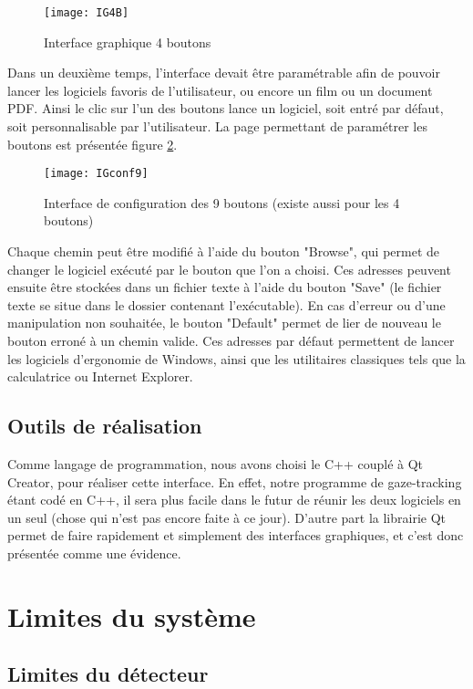 \begin{figure}[H]
  \centering
  \texttt{[image: IG4B]}
  \caption{Interface graphique 4 boutons}
  \label{fig:IG4B}
\end{figure}

Dans un deuxième temps, l’interface devait être paramétrable afin de pouvoir lancer les logiciels favoris de l’utilisateur, ou encore un film ou un document PDF. Ainsi le clic sur l’un des boutons lance un logiciel, soit entré par défaut, soit personnalisable par l’utilisateur. La page permettant de paramétrer les boutons est présentée figure \ref{fig:IGconf9}.

\begin{figure}[H]
  \centering
  \texttt{[image: IGconf9]}
  \caption{Interface de configuration des 9 boutons (existe aussi pour les 4 boutons)}
  \label{fig:IGconf9}
\end{figure}

Chaque chemin peut être modifié à l’aide du bouton "Browse", qui permet de changer le logiciel exécuté par le bouton que l’on a choisi. Ces adresses peuvent ensuite être stockées dans un fichier texte à l’aide du bouton "Save" (le fichier texte se situe dans le dossier contenant l’exécutable). En cas d’erreur ou d’une manipulation non souhaitée, le bouton "Default" permet de lier de nouveau le bouton erroné à un chemin valide. Ces adresses par défaut permettent de lancer les logiciels d’ergonomie de Windows, ainsi que les utilitaires classiques tels que la calculatrice ou Internet Explorer.

\subsection{Outils de réalisation}

Comme langage de programmation, nous avons choisi le C++ couplé à Qt Creator, pour réaliser cette interface. En effet, notre programme de gaze-tracking étant codé en C++, il sera plus facile dans le futur de réunir les deux logiciels en un seul (chose qui n’est pas encore faite à ce jour). D’autre part la librairie Qt permet de faire rapidement et simplement des interfaces graphiques, et c’est donc présentée comme une évidence.

\section{Limites du système}

\subsection{Limites du détecteur}

